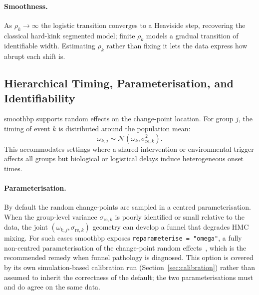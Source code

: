 \documentclass[12pt]{article}
\newcommand{\pkg}[1]{\textsf{#1}}
\newcommand{\code}[1]{\texttt{#1}}
\begin{document}
\paragraph{Smoothness.} As $\rho_k \to \infty$ the logistic transition converges to a Heaviside step, recovering the classical hard-kink segmented model; finite $\rho_k$ models a gradual transition of identifiable width. Estimating $\rho_k$ rather than fixing it lets the data express how abrupt each shift is.

\subsection{Hierarchical Timing, Parameterisation, and Identifiability}

\pkg{smoothbp} supports random effects on the change-point location. For group $j$, the timing of event $k$ is distributed around the population mean:
\begin{equation}
\omega_{k,j} \sim \mathcal{N}(\omega_k, \sigma_{\mathrm{re},k}^2).
\end{equation}
This accommodates settings where a shared intervention or environmental trigger affects all groups but biological or logistical delays induce heterogeneous onset times.

\paragraph{Parameterisation.} By default the random change-points are sampled in a centred parameterisation. When the group-level variance $\sigma_{\mathrm{re},k}$ is poorly identified or small relative to the data, the joint $(\omega_{k,j}, \sigma_{\mathrm{re},k})$ geometry can develop a funnel that degrades HMC mixing. For such cases \pkg{smoothbp} exposes \code{reparameterise = "omega"}, a fully non-centred parameterisation of the change-point random effects~\cite{papaspiliopoulos2007}, which is the recommended remedy when funnel pathology is diagnosed. This option is covered by its own simulation-based calibration run (Section~\ref{sec:calibration}) rather than assumed to inherit the correctness of the default; the two parameterisations must and do agree on the same data.
\end{document}
